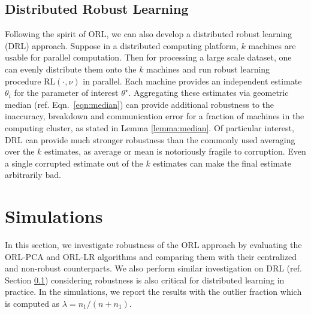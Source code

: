 \documentclass[11pt]{article}
\begin{document}
\subsection{Distributed Robust Learning}
\label{sec:drl}
Following the spirit of ORL, we can also develop a distributed robust learning (DRL) approach. Suppose in a distributed computing platform, $k$ machines are usable for parallel computation. Then for processing a large scale dataset, one can evenly distribute them onto the $k$ machines and run robust learning procedure $\text{RL}(\cdot, \nu)$ in parallel. Each machine provides  an independent estimate $\theta_i$ for the parameter of interest $\theta^\star$. Aggregating these estimates via geometric median (ref. Eqn.~\eqref{eqn:median}) can provide additional robustness to the inaccuracy, breakdown and communication error for a fraction of machines in the computing cluster, as stated in Lemma \ref{lemma:median}. Of particular interest, DRL can provide much stronger robustness than the commonly used averaging over the $k$ estimates, as average or mean is notoriously fragile to corruption. Even a single corrupted estimate out of the  $k$ estimates can make the final estimate arbitrarily bad.

\section{Simulations}
In this section, we investigate  robustness of the  ORL approach by evaluating the ORL-PCA and ORL-LR algorithms  and comparing them with their centralized and non-robust counterparts. We also perform similar investigation on DRL (ref. Section \ref{sec:drl}) considering robustness is also critical for distributed learning  in practice.
In the simulations, we report the results with the outlier fraction which is computed as $ \lambda = n_1/(n+n_1) $.
\end{document}
